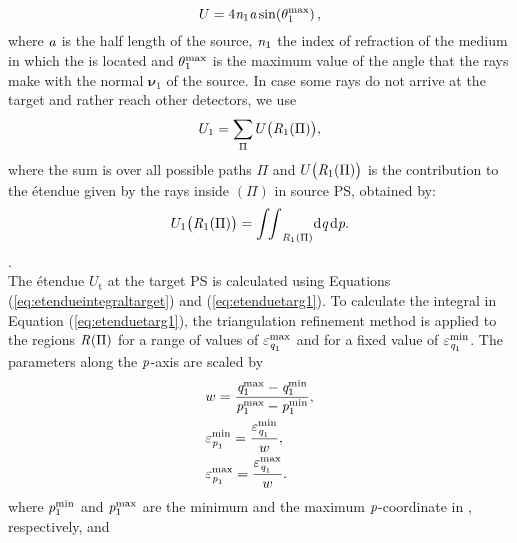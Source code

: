 \begin{equation}\label{eq:etenduesource}
U = 4\textit{n}_1 \textit{a} \sin(\theta_1^{\textrm{max}})\,,
\end{equation}
 where $\textit{a}$ is the half length of the source, $\textit{n}_1$ the index of refraction of the medium in which the  is located and $\theta_1^{\textrm{max}}$ is the maximum value of the angle that the rays make with the normal $\boldsymbol{\nu}_1$ of the source.
In case some rays do not arrive at the target and rather reach other detectors, we use
\begin{equation}\label{eq:etenduesumsource}
U_1 = \sum_\Pi{U\big(\mbox{$\emph{R}_{\textit{$1$}}$}(\Pi)\big)},
\end{equation}
where the sum is over all possible paths $\Pi$ and $U\big(\mbox{$\emph{R}_{\textit{$1$}}$}(\Pi)\big)$ is the contribution to the \'{e}tendue given by the rays inside $(\Pi)$ in source PS, obtained by:
\begin{equation}\label{eq:etendueintegralsource}
U_1\big(\mbox{$\emph{R}_{\textit{$1$}}$}(\Pi)\big) = {\int\!\!\int}_{\emph{R}_1(\Pi)} \textrm{d}\textit{q}\,\textrm{d}\textit{p}.
\end{equation}. 
\\ \indent The \'{e}tendue $U_{\textrm{t}}$ at the target PS  is calculated using Equations (\ref{eq:etendueintegraltarget}) and (\ref{eq:etenduetarg1}).
To calculate the integral in Equation (\ref{eq:etenduetarg1}), the triangulation refinement method is applied to the regions $\mbox{$\emph{R}_{\textit{}}$}(\Pi)$ for a range of values of $\varepsilon_{\textit{q}_1}^{\textrm{max}}$ and for a fixed value of $\varepsilon_{\textit{q}_1}^{\textrm{min}}$. The parameters along the $\textit{p}$-axis are scaled by 
\begin{equation}\label{eq:scaled_parameters}
\begin{aligned}
& w = \frac{\textit{q}_1^{\textrm{max}}-\textit{q}_1^{\textrm{min}}}{\textit{p}_1^{\textrm{max}}-\textit{p}_1^{\textrm{min}}},\\
&\varepsilon_{\textit{p}_1}^{\textrm{min}}= \frac{\varepsilon_{\textit{q}_1}^{\textrm{min}}}{w}, \\
&\varepsilon_{\textit{p}_1}^{\textrm{max}}= \frac{\varepsilon_{\textit{q}_1}^{\textrm{max}}}{w}.
\end{aligned}
\end{equation}
 where 
$\textit{p}_1^{\textrm{min}}$ and $\textit{p}_1^{\textrm{max}}$ are the minimum and the maximum $\textit{p}$-coordinate in , respectively, and 
